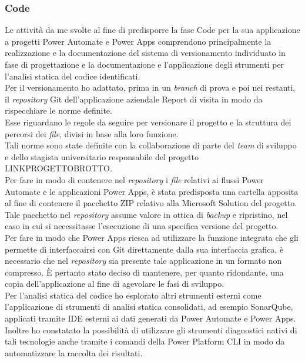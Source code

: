 \subsubsection*{Code}
Le attività da me svolte al fine di predisporre la fase Code per la sua applicazione a progetti Power Automate e Power Apps comprendono principalmente la realizzazione e la documentazione del sistema di versionamento individuato in fase di progettazione e la documentazione e l'applicazione degli strumenti per l'analisi statica del codice identificati.\\
Per il versionamento ho adattato, prima in un \emph{branch} di prova e poi nei restanti, il \emph{repository} Git dell'applicazione aziendale Report di visita in modo da rispecchiare le norme definite.\\
Esse riguardano le regole da seguire per versionare il progetto e la struttura dei percorsi dei \emph{file}, divisi in base alla loro funzione.\\  
Tali norme sono state definite con la collaborazione di parte del \emph{team} di sviluppo e dello stagista universitario responsabile del progetto LINKPROGETTOBROTTO.\\ 
Per fare in modo di contenere nel \emph{repository} i \emph{file} relativi ai flussi Power Automate e le applicazioni Power Apps, è stata predisposta una cartella apposita al fine di contenere il pacchetto ZIP relativo alla Microsoft Solution del progetto.\\ 
Tale pacchetto nel \emph{repository} assume valore in ottica di \emph{backup} e ripristino, nel caso in cui si necessitasse l'esecuzione di una specifica versione del progetto.\\  
Per fare in modo che Power Apps riesca ad utilizzare la funzione integrata che gli permette di interfaccairsi con Git direttamente dalla sua interfaccia grafica, è necessario che nel \emph{repository} sia presente tale applicazione in un formato non compresso. È pertanto stato deciso di mantenere, per quanto ridondante, una copia dell'applicazione al fine di agevolare le fasi di sviluppo.\\ 
Per l'analisi statica del codice ho esplorato altri strumenti esterni come l'applicazione di strumenti di analisi statica consolidati, ad esempio SonarQube, applicati tramite IDE esterni ai dati generati da Power Automate e Power Apps.\\  
Inoltre ho constatato la possibilità di utilizzare gli strumenti diagnostici nativi di tali tecnologie anche tramite i comandi della Power Platform CLI in modo da automatizzare la raccolta dei risultati.\\ 
